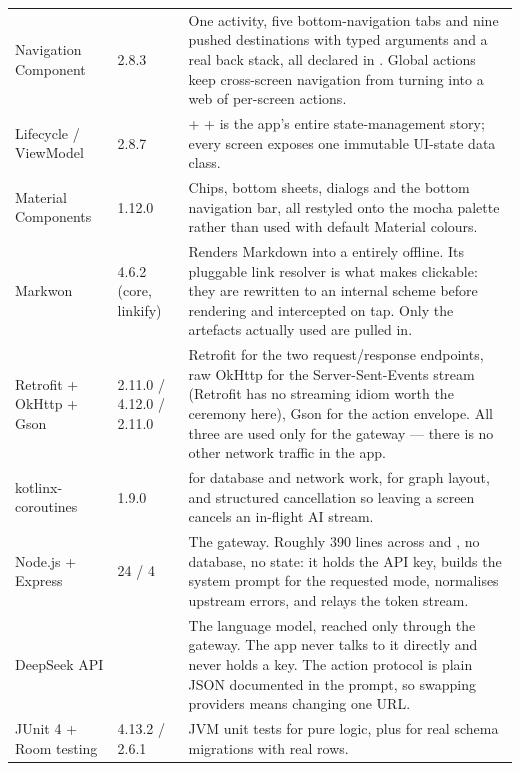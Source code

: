 \begin{xltabular}{\linewidth}{L{4.3cm} L{2.15cm} X}
\addlinespace
Navigation Component & 2.8.3 &
One activity, five bottom-navigation tabs and nine pushed destinations with typed arguments and a real
back stack, all declared in . Global actions keep cross-screen navigation from
turning into a web of per-screen actions. \\
\addlinespace
Lifecycle / ViewModel & 2.8.7 &
 +  +  is the app's entire state-management
story; every screen exposes one immutable UI-state data class. \\
\addlinespace
Material Components & 1.12.0 &
Chips, bottom sheets, dialogs and the bottom navigation bar, all restyled onto the mocha palette rather
than used with default Material colours. \\
\addlinespace
Markwon & 4.6.2 (core, linkify) &
Renders Markdown into a  entirely offline. Its pluggable link resolver is what makes
 clickable: they are rewritten to an internal  scheme before
rendering and intercepted on tap. Only the artefacts actually used are pulled in. \\
\addlinespace
Retrofit + OkHttp + Gson & 2.11.0 / 4.12.0 / 2.11.0 &
Retrofit for the two request/response endpoints, raw OkHttp for the Server-Sent-Events stream (Retrofit
has no streaming idiom worth the ceremony here), Gson for the action envelope. All three are used only
for the gateway --- there is no other network traffic in the app. \\
\addlinespace
kotlinx-coroutines & 1.9.0 &
 for database and network work,  for graph layout, and
structured cancellation so leaving a screen cancels an in-flight AI stream. \\
\addlinespace
Node.js + Express & 24 / 4 &
The gateway. Roughly 390 lines across  and , no database, no state: it
holds the API key, builds the system prompt for the requested mode, normalises upstream errors, and
relays the token stream. \\
\addlinespace
DeepSeek API &  &
The language model, reached only through the gateway. The app never talks to it directly and never holds
a key. The action protocol is plain JSON documented in the prompt, so swapping providers means changing
one URL. \\
\addlinespace
JUnit 4 + Room testing & 4.13.2 / 2.6.1 &
JVM unit tests for pure logic, plus  for real schema migrations with real rows. \\
\bottomrule
\end{xltabular}

